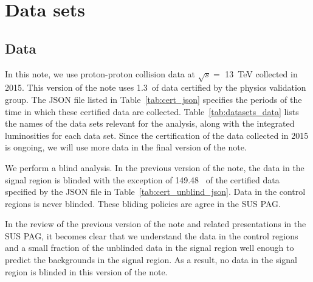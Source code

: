 \section{Data sets}
\label{sec:datasets}

\subsection{Data}


In this note, we use proton-proton collision data at $\sqrt{s} =$
13~TeV collected in 2015. This version of the note uses 1.3~\ifb of
data certified by the physics validation group. The JSON file listed
in Table~\ref{tab:cert_json} specifies the periods of the time in
which these certified data are collected.
Table~\ref{tab:datasets_data} lists the names of the data sets
relevant for the analysis, along with the integrated luminosities for
each data set. Since the certification of the data collected in 2015
is ongoing, we will use more data in the final version of the note.

We perform a blind analysis. In the previous version of the note, the
data in the signal region is blinded with the exception of 149.48~\ipb
of the certified data specified by the JSON file in
Table~\ref{tab:cert_unblind_json}. Data in the control regions is
never blinded. These bliding policies are agree in the SUS PAG.

In the review of the previous version of the note and related
presentations in the SUS PAG, it becomes clear that we understand the
data in the control regions and a small fraction of the unblinded data
in the signal region well enough to predict the backgrounds in the
signal region. As a result, no data in the signal region is blinded in
this version of the note.

\begin{table}[!h]
 \footnotesize
 \label{tab:cert_json}
\end{table}

\begin{table}[!h]
\footnotesize 
\label{tab:datasets_data}
\end{table}

\begin{table}[!h]
 \footnotesize

\label{tab:cert_unblind_json}
\end{table}

